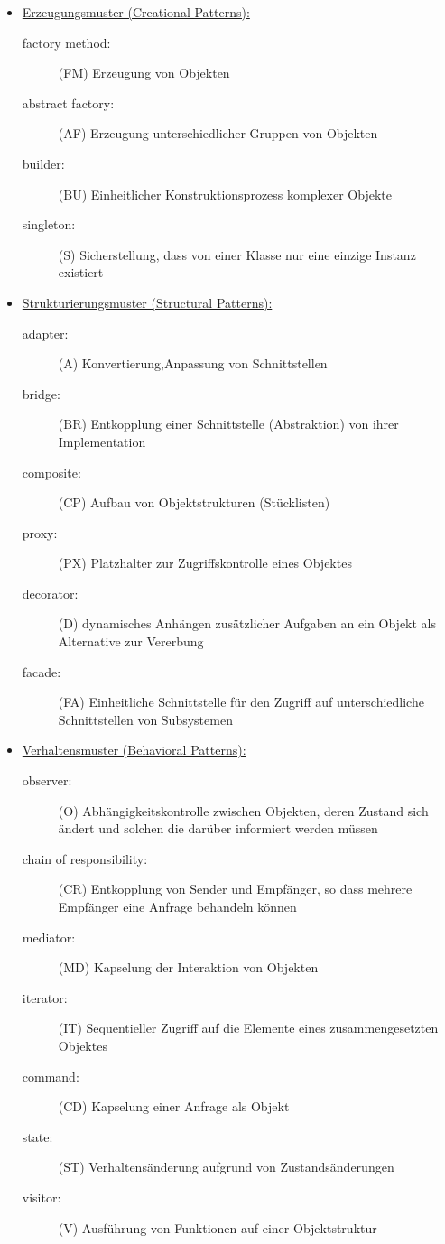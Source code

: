 \begin{itemize}
\item \underline{Erzeugungsmuster (Creational Patterns):}
  \begin{description}
  \item [factory method:] (FM) Erzeugung von Objekten
  \item [abstract factory:] (AF) Erzeugung unterschiedlicher Gruppen von Objekten
  \item [builder:] (BU) Einheitlicher Konstruktionsprozess komplexer Objekte
  \item [singleton:] (S) Sicherstellung, dass von einer Klasse nur eine
    einzige Instanz existiert
  \end{description}
\newslide
\item \underline{Strukturierungsmuster (Structural Patterns):}
  \begin{description}
  \item[adapter:](A) Konvertierung,Anpassung von Schnittstellen
  \item[bridge:] (BR) Entkopplung einer Schnittstelle (Abstraktion) von
    ihrer Implementation
  \item[composite:] (CP) Aufbau von Objektstrukturen (Stücklisten)
  \item[proxy:] (PX) Platzhalter zur Zugriffskontrolle eines Objektes
  \item[decorator:] (D) dynamisches Anhängen zusätzlicher Aufgaben an ein
    Objekt als Alternative zur Vererbung
  \item[facade:] (FA) Einheitliche Schnittstelle für den Zugriff auf
    unterschiedliche Schnittstellen von Subsystemen
  \end{description}
\newpage
\item \underline{Verhaltensmuster (Behavioral Patterns):}
  \begin{description}
  \item[observer:] (O) Abhängigkeitskontrolle zwischen Objekten, deren Zustand
   sich ändert und solchen
    die darüber informiert werden müssen
  \item[chain of responsibility:] (CR) Entkopplung von Sender und Empfänger,
    so dass mehrere Empfänger eine Anfrage behandeln können
  \item[mediator:] (MD) Kapselung der Interaktion von Objekten
  \item[iterator:] (IT) Sequentieller Zugriff auf die Elemente eines
     zusammengesetzten Objektes
  \item[command:] (CD) Kapselung einer Anfrage als Objekt
  \item[state:] (ST) Verhaltensänderung aufgrund von Zustandsänderungen
  \item[visitor:] (V) Ausführung von Funktionen auf einer Objektstruktur
  \end{description}
\end{itemize}
